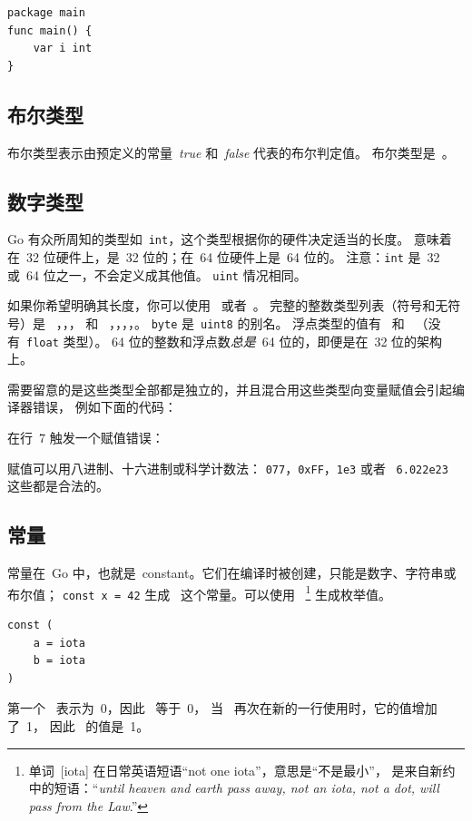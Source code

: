 \begin{lstlisting}
package main
func main() { 
    var i int
}
\end{lstlisting}

\subsection{布尔类型}
布尔类型表示由预定义的常量~\emph{true} 和~\emph{false} 代表的布尔判定值。
布尔类型是~。

\subsection{数字类型}
Go 有众所周知的类型如~\lstinline{int}，这个类型根据你的硬件决定适当的长度。
意味着在~32 位硬件上，是~32 位的；在~64 位硬件上是~64 位的。
注意：\lstinline{int} 是~32 或~64 位之一，不会定义成其他值。
\lstinline{uint} 情况相同。

如果你希望明确其长度，你可以使用~ 或者~。
完整的整数类型列表（符号和无符号）是~
，，， 和~
，，，，。
\lstinline{byte} 是~\lstinline{uint8} 的别名。
浮点类型的值有~ 和~
（没有~\lstinline{float} 类型）。 
64 位的整数和浮点数\emph{总是}~64 位的，即便是在~32 位的架构上。

需要留意的是这些类型全部都是独立的，并且混合用这些类型向变量赋值会引起编译器错误，
例如下面的代码：

在行~7 触发一个赋值错误：

\noindent{}

赋值可以用八进制、十六进制或科学计数法：
\lstinline{077}，\lstinline{0xFF}，\lstinline{1e3} 或者~
\mbox{\lstinline{6.022e23}} 这些都是合法的。

\subsection{常量}
\label{sec:constants}
常量在~Go 中，也就是~constant。它们在编译时被创建，只能是数字、字符串或布尔值；
\lstinline{const x = 42} 生成~ 这个常量。可以使用~
\footnote{单词~[iota] 在日常英语短语``not one iota''，意思是``不是最小''，
是来自新约中的短语：``\emph{until heaven and earth pass away, not an
iota, not a dot, will pass from the Law}.''\cite{iota}}
生成枚举值。
\begin{lstlisting}
const (
	a = iota
	b = iota 
)
\end{lstlisting}
第一个~ 表示为~0，因此~ 等于~0，
当~ 再次在新的一行使用时，它的值增加了~1，
因此~ 的值是~1。

